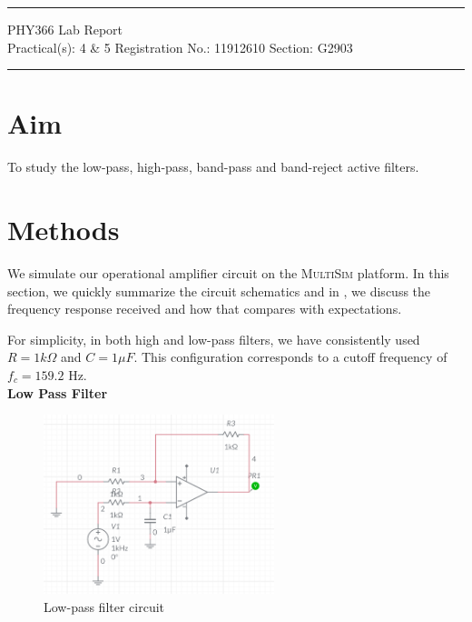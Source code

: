 \documentclass{article}
\begin{document}
	
	\author{Aayush Arya}
	\date{(Submitted: \today)}
	\title{}
	
	\maketitle
	
	\hrule
	\begin{center}
		PHY366 Lab Report\\
		Practical(s): 4 \& 5 \quad Registration No.: 11912610 \quad Section: G2903
	\end{center}
	\hrule
	
	\section*{Aim}
	To study the low-pass, high-pass, band-pass and band-reject active filters.
	
	\section*{Methods}
	
	We simulate our operational amplifier circuit on the \textsc{MultiSim} platform. In this section, we quickly summarize the circuit schematics and in , we discuss the frequency response received and how that compares with expectations.
	
	For simplicity, in both high and low-pass filters, we have consistently used $R=1k\Omega$ and $C = 1\mu F$. This configuration corresponds to a cutoff frequency of $f_c = 159.2$ Hz.\\
	
	\textbf{Low Pass Filter}
	
	
	\begin{figure}[h!]
		\centering
		\includegraphics[width=0.6\textwidth]{low_pass_circuit}
		\caption{Low-pass filter circuit}
		\label{fig:low_pass_circuit}
	\end{figure}
	
\end{document}
